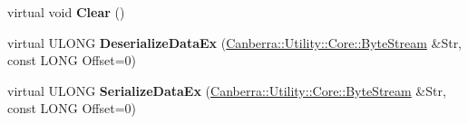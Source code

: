\begin{DoxyCompactItemize}
virtual void {\bfseries Clear} ()
\item 
\mbox{\label{class_canberra_1_1_data_types_1_1_spectroscopy_1_1_list_data_impl_ac3dcc8cc2d49328ef2e1178fc3337c26}} 
virtual U\+L\+O\+NG {\bfseries Deserialize\+Data\+Ex} (\hyperlink{class_canberra_1_1_utility_1_1_core_1_1_byte_stream}{Canberra\+::\+Utility\+::\+Core\+::\+Byte\+Stream} \&Str, const L\+O\+NG Offset=0)
\item 
\mbox{\label{class_canberra_1_1_data_types_1_1_spectroscopy_1_1_list_data_impl_ae045027867f61e736fde091126d2c0cf}} 
virtual U\+L\+O\+NG {\bfseries Serialize\+Data\+Ex} (\hyperlink{class_canberra_1_1_utility_1_1_core_1_1_byte_stream}{Canberra\+::\+Utility\+::\+Core\+::\+Byte\+Stream} \&Str, const L\+O\+NG Offset=0)
\end{DoxyCompactItemize}

